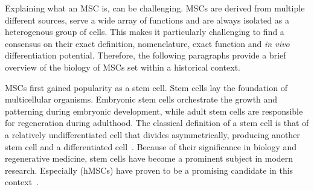 Explaining what an \ac{MSC} is, can be challenging. MSCs
are derived from multiple different sources, serve a wide array of functions and
are always isolated as a heterogenous group of cells. This makes it particularly
challenging to find a consensus on their exact definition, nomenclature, exact
function and \textit{in vivo} differentiation potential. Therefore, the
following paragraphs provide a brief overview of the biology of MSCs set within
a historical context.

\acp{MSC} first gained popularity as a stem cell. Stem cells lay the foundation
of multicellular organisms. Embryonic stem cells orchestrate the growth and
patterning during embryonic development, while adult stem cells are responsible
for regeneration during adulthood. The classical definition of a stem cell is
that of a relatively undifferentiated cell that divides asymmetrically,
producing another stem cell and a differentiated
cell~\cite{cooperCellMolecularApproach2000, shenghuiMechanismsStemCell2009}.
Because of their significance in biology and regenerative medicine, stem cells
have become a prominent subject in modern research. Especially (\acp{hMSC})
have proven to be a promising candidate in this
context~\cite{ullahHumanMesenchymalStem2015}.

